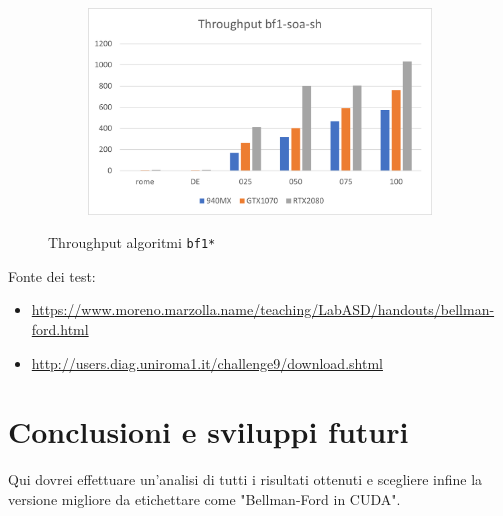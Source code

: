 \documentclass[12pt,a4paper]{book} %
\begin{document}
\begin{figure}[b]
\begin{subfigure}{.5\textwidth}
		\end{subfigure}%
		\begin{subfigure}{.5\textwidth}
			\centering
			\includegraphics[width=\textwidth]{throughput_bf1-soa-sh}
		\end{subfigure}
		\caption{Throughput algoritmi \texttt{bf1*}}
		\label{fig:throughput_bf1}
	\end{figure}
	
	Fonte dei test:
	\begin{itemize}
		\item \url{https://www.moreno.marzolla.name/teaching/LabASD/handouts/bellman-ford.html}
		\item \url{http://users.diag.uniroma1.it/challenge9/download.shtml}
	\end{itemize}
	
	\chapter*{Conclusioni e sviluppi futuri}
	\label{section:end}
	Qui dovrei effettuare un'analisi di tutti i risultati ottenuti e scegliere infine la versione migliore da etichettare come "Bellman-Ford in CUDA".
	
	\printbibliography
	
\end{document}
